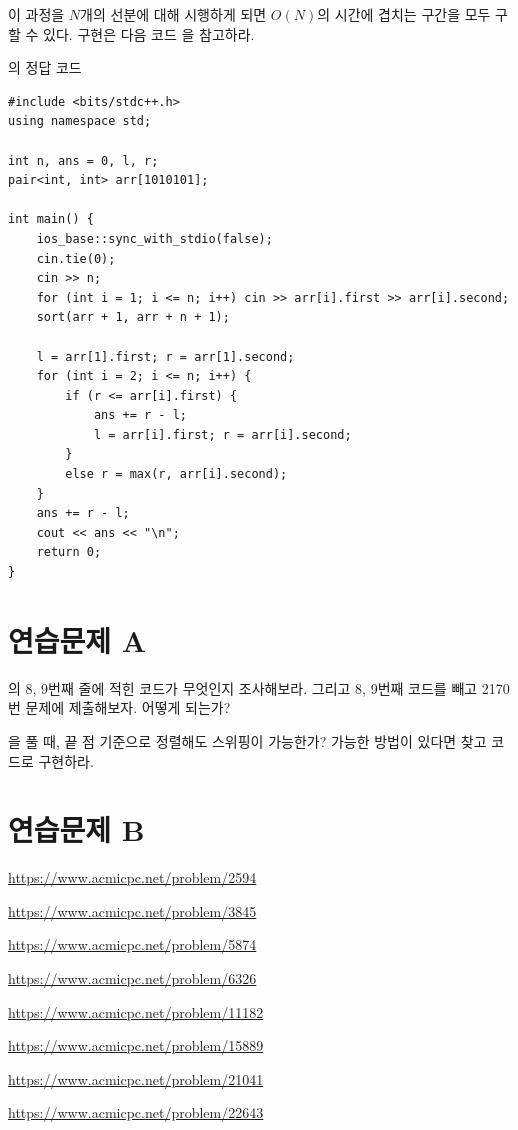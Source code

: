 이 과정을 $N$개의 선분에 대해 시행하게 되면 $O(N)$의 시간에 겹치는 구간을 모두 구할 수 있다. 구현은 다음 코드 을 참고하라.
\begin{code} \label{code: sweeping}
의 정답 코드
\begin{lstlisting}
#include <bits/stdc++.h>
using namespace std;

int n, ans = 0, l, r;
pair<int, int> arr[1010101];

int main() {
    ios_base::sync_with_stdio(false);
    cin.tie(0);
    cin >> n;
    for (int i = 1; i <= n; i++) cin >> arr[i].first >> arr[i].second;
    sort(arr + 1, arr + n + 1);
    
    l = arr[1].first; r = arr[1].second;
    for (int i = 2; i <= n; i++) {
        if (r <= arr[i].first) {
            ans += r - l;
            l = arr[i].first; r = arr[i].second;
        }
        else r = max(r, arr[i].second);
    }
    ans += r - l;
    cout << ans << "\n";
    return 0;
}
\end{lstlisting}
\end{code}

\section{연습문제 A}
\begin{problem}
    의 8, 9번째 줄에 적힌 코드가 무엇인지 조사해보라. 그리고 8, 9번째 코드를 빼고 2170번 문제에 제출해보자. 어떻게 되는가?
\end{problem}
\begin{problem}
    을 풀 때, 끝 점 기준으로 정렬해도 스위핑이 가능한가? 가능한 방법이 있다면 찾고 코드로 구현하라.
\end{problem}

\section{연습문제 B}

\begin{problem} \url{https://www.acmicpc.net/problem/2594} \end{problem}
\begin{problem} \url{https://www.acmicpc.net/problem/3845} \end{problem}
\begin{problem} \url{https://www.acmicpc.net/problem/5874} \end{problem}
\begin{problem} \url{https://www.acmicpc.net/problem/6326} \end{problem}
\begin{problem} \url{https://www.acmicpc.net/problem/11182} \end{problem}
\begin{problem} \url{https://www.acmicpc.net/problem/15889} \end{problem}
\begin{problem} \url{https://www.acmicpc.net/problem/21041} \end{problem}
\begin{problem} \url{https://www.acmicpc.net/problem/22643} \end{problem}

